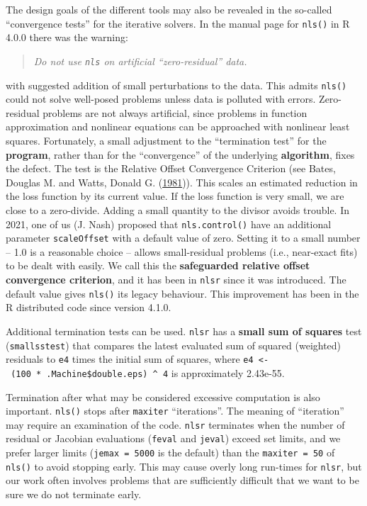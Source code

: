 \documentclass[
]{article}
\begin{document}
The design goals of the different tools may also be revealed in the
so-called ``convergence tests'' for the iterative solvers. In the manual
page for \texttt{nls()} in R 4.0.0 there was the warning:

\begin{quote}
\emph{Do not use \texttt{nls} on artificial ``zero-residual'' data.}
\end{quote}

with suggested addition of small perturbations to the data. This admits
\texttt{nls()} could not solve well-posed problems unless data is
polluted with errors. Zero-residual problems are not always artificial,
since problems in function approximation and nonlinear equations can be
approached with nonlinear least squares. Fortunately, a small adjustment
to the ``termination test'' for the \textbf{program}, rather than for
the ``convergence'' of the underlying \textbf{algorithm}, fixes the
defect. The test is the Relative Offset Convergence Criterion (see
Bates, Douglas M. and Watts, Donald G.
(\protect\hyperlink{ref-BatesWatts81}{1981})). This scales an estimated
reduction in the loss function by its current value. If the loss
function is very small, we are close to a zero-divide. Adding a small
quantity to the divisor avoids trouble. In 2021, one of us (J. Nash)
proposed that \texttt{nls.control()} have an additional parameter
\texttt{scaleOffset} with a default value of zero. Setting it to a small
number -- 1.0 is a reasonable choice -- allows small-residual problems
(i.e., near-exact fits) to be dealt with easily. We call this the
\textbf{safeguarded relative offset convergence criterion}, and it has
been in \texttt{nlsr} since it was introduced. The default value gives
\texttt{nls()} its legacy behaviour. This improvement has been in the R
distributed code since version 4.1.0.

Additional termination tests can be used. \texttt{nlsr} has a
\textbf{small sum of squares} test (\texttt{smallsstest}) that compares
the latest evaluated sum of squared (weighted) residuals to \texttt{e4}
times the initial sum of squares, where
\texttt{e4\ \textless{}-\ (100\ *\ .Machine\$double.eps)\ \^{}\ 4} is
approximately 2.43e-55.

Termination after what may be considered excessive computation is also
important. \texttt{nls()} stops after \texttt{maxiter} ``iterations''.
The meaning of ``iteration'' may require an examination of the code.
\texttt{nlsr} terminates when the number of residual or Jacobian
evaluations (\texttt{feval} and \texttt{jeval}) exceed set limits, and
we prefer larger limits (\texttt{jemax\ =\ 5000} is the default) than
the \texttt{maxiter\ =\ 50} of \texttt{nls()} to avoid stopping early.
This may cause overly long run-times for \texttt{nlsr}, but our work
often involves problems that are sufficiently difficult that we want to
be sure we do not terminate early.
\end{document}
